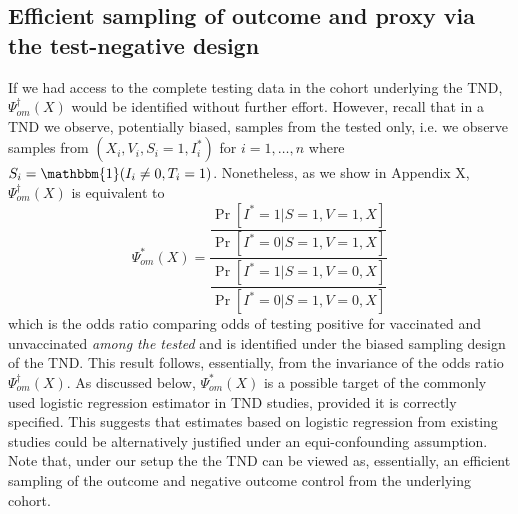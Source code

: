 \documentclass[11pt]{article}
\begin{document}
\subsection{Efficient sampling of outcome and proxy via the test-negative design}
If we had access to the complete testing data in the cohort underlying the TND, $\Psi^\dagger_{om}(X)$ would be identified without further effort. However, recall that in a TND we observe, potentially biased, samples from the tested only, i.e. we observe samples from $(X_i, V_i, S_i = 1, I^*_i)$ for $i = 1, \ldots, n$ where $S_i = \mathbbm{1}(I_i \neq 0, T_i = 1)$. Nonetheless, as we show in Appendix X, $\Psi^\dagger_{om}(X)$ is equivalent to 
    \begin{equation}\label{eqn:or_estimand}
         \Psi^*_{om}(X) = \dfrac{\dfrac{\Pr[I^* = 1 | S = 1, V = 1, X]}{\Pr[I^* = 0 | S = 1, V = 1, X]}}{\dfrac{\Pr[I^* = 1 | S = 1, V = 0, X]}{\Pr[I^* = 0 | S = 1, V = 0, X]}}
    \end{equation}    
which is the odds ratio comparing odds of testing positive for vaccinated and unvaccinated \textit{among the tested} and is identified under the biased sampling design of the TND. This result follows, essentially, from the invariance of the odds ratio $\Psi^\dagger_{om}(X)$. As discussed below, $\Psi^*_{om}(X)$ is a possible target of the commonly used logistic regression estimator in TND studies, provided it is correctly specified. This suggests that estimates based on logistic regression from existing studies could be alternatively justified under an equi-confounding assumption. Note that, under our setup the the TND can be viewed as, essentially, an efficient sampling of the outcome and negative outcome control from the underlying cohort.
\end{document}
